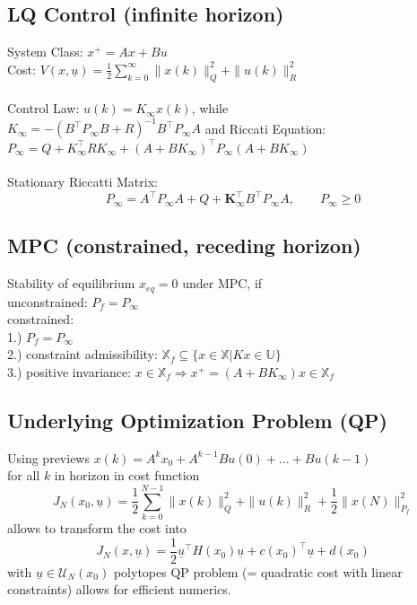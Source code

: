 \documentclass[english]{latex4ei/latex4ei_sheet}
\begin{document}
\begin{sectionbox}
\subsection{LQ Control (infinite horizon)}
System Class: $x^{+}=A x+B u$ \\
Cost: $V(x, \underline{u})=\frac{1}{2} \sum\limits_{k=0}^{\infty}\|x(k)\|_{Q}^{2}+\|u(k)\|_{R}^{2}$ \\
\\
Control Law: $u(k)=K_{\infty} x(k)$, while \\ $K_{\infty}=-\left(B^{\top} P_{\infty} B+R\right)^{-1} B^{\top} P_{\infty} A$ and Riccati Equation:\\ 
${P_{\infty}=Q+K_{\infty}^{\top} R K_{\infty}+\left(A+B K_{\infty}\right)^{\top} P_{\infty}\left(A+B K_{\infty}\right)}$\\
\\
Stationary Riccatti Matrix:
$$P_{\infty}=A^{\top} P_{\infty} A+Q+\boldsymbol{K}_{\infty}^{\top}B^{\top} P_{\infty}A,\qquad P_{\infty}\geq 0$$

\subsection{MPC (constrained, receding horizon)}
Stability of equilibrium $x_{eq}=0$ under MPC, if\\
unconstrained: $P_{f}=P_{\infty}$\\
constrained:\\
1.) $P_{f}=P_{\infty}$ \\
2.) constraint admissibility: $\mathbb{X}_{f} \subseteq\{x \in \mathbb{X} | K x \in \mathbb{U}\}$ \\
3.) positive invariance: $x \in \mathbb{X}_{f} \Rightarrow x^{+}=\left(A+B K_{\infty}\right) x \in \mathbb{X}_{f}$\\

\subsection{Underlying Optimization Problem (QP)}
Using previews $x(k)=A^{k}x_{0}+A^{k-1}Bu(0)+\ldots+Bu(k-1)$\\
for all $k$ in horizon in cost function 
$$J_{N}\left(x_{0}, \underline{u}\right)=\frac{1}{2} \sum\limits_{k=0}^{N-1}\|x(k)\|_{Q}^{2}+\|u(k)\|_{R}^{2}+\frac{1}{2}\|x(N)\|_{P_{f}}^{2}$$
allows to transform the cost into $$J_N(x,\underline{u})=\frac{1}{2}\underline{u}^{\top}H(x_0)\underline{u}+c(x_{0})^{\top}\underline{u}+d(x_{0})$$
with $\underline{u}\in\mathcal{U}_{N}(x_{0})$
polytopes QP problem (= quadratic cost with linear constraints) allows for efficient numerics.

\end{sectionbox}
\end{document}
